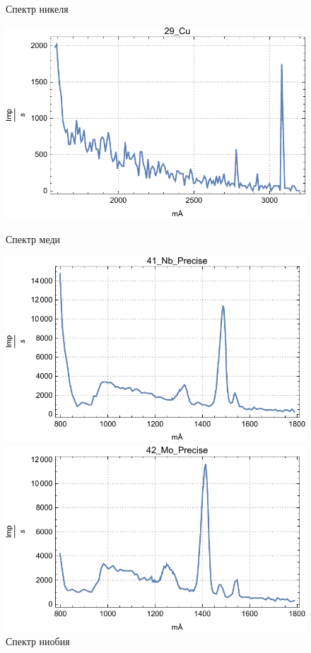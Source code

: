 \documentclass[a4paper, 12pt]{article}
\begin{document}
\begin{enumerate}
\begin{figure}[!htb]
		\caption{Спектр никеля}
		\endminipage\hfill
		\includegraphics[width=\linewidth]{PhysLab5/29_Cu.pdf}
		\caption{Спектр меди}
		\endminipage\hfill
		\includegraphics[width=\linewidth]{PhysLab5/41_Nb_Precise.pdf}
		\caption{Спектр ниобия}
		\endminipage\hfill
		\includegraphics[width=\linewidth]{PhysLab5/42_Mo_Precise.pdf}

\end{figure}
\end{enumerate}
\end{document}
